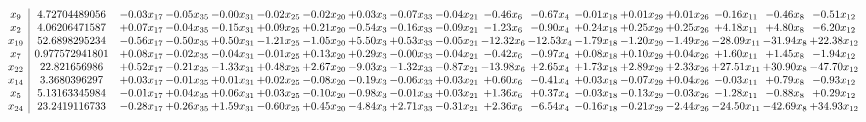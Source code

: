\documentclass[9pt]{article}
\begin{document}
 \[\begin{array}{c| c c@{\hskip 2pt} c@{\hskip 2pt} c@{\hskip 2pt} c@{\hskip 2pt} c@{\hskip 2pt} c@{\hskip 2pt} c@{\hskip 2pt} c@{\hskip 2pt} c@{\hskip 2pt} c@{\hskip 2pt} c@{\hskip 2pt} c@{\hskip 2pt} c@{\hskip 2pt} c@{\hskip 2pt} c@{\hskip 2pt} c@{\hskip 2pt} }
 x_{9}   &  4.72704489056 & -0.03 x_{17} & -0.05 x_{35} & -0.00 x_{31} & -0.02 x_{25} & -0.02 x_{20} & +  0.03 x_{3} & -0.07 x_{33} & -0.04 x_{21} & -0.46 x_{6} & -0.67 x_{4} & -0.01 x_{18} & +  0.01 x_{29} & +  0.01 x_{26} & -0.16 x_{11} & -0.46 x_{8} & -0.51 x_{12}\\
 x_{2}   &  4.06206471587 & +  0.07 x_{17} & -0.04 x_{35} & -0.15 x_{31} & +  0.09 x_{25} & +  0.21 x_{20} & -0.54 x_{3} & -0.16 x_{33} & -0.09 x_{21} & -1.23 x_{6} & -0.90 x_{4} & +  0.24 x_{18} & +  0.25 x_{29} & +  0.25 x_{26} & +  4.18 x_{11} & +  4.80 x_{8} & -6.20 x_{12}\\
 x_{19}   &  52.6898295234 & -0.56 x_{17} & -0.50 x_{35} & +  0.50 x_{31} & -1.21 x_{25} & -1.05 x_{20} & +  5.50 x_{3} & +  0.53 x_{33} & -0.05 x_{21} & -12.32 x_{6} & -12.53 x_{4} & -1.79 x_{18} & -1.20 x_{29} & -1.49 x_{26} & -28.09 x_{11} & -31.94 x_{8} & + 22.38 x_{12}\\
 x_{7}   &  0.977572941801 & +  0.08 x_{17} & -0.02 x_{35} & -0.04 x_{31} & -0.01 x_{25} & +  0.13 x_{20} & +  0.29 x_{3} & -0.00 x_{33} & -0.04 x_{21} & -0.42 x_{6} & -0.97 x_{4} & +  0.08 x_{18} & +  0.10 x_{29} & +  0.04 x_{26} & +  1.60 x_{11} & +  1.45 x_{8} & -1.94 x_{12}\\
 x_{22}   &  22.821656986 & +  0.52 x_{17} & -0.21 x_{35} & -1.33 x_{31} & +  0.48 x_{25} & +  2.67 x_{20} & -9.03 x_{3} & -1.32 x_{33} & -0.87 x_{21} & -13.98 x_{6} & +  2.65 x_{4} & +  1.73 x_{18} & +  2.89 x_{29} & +  2.33 x_{26} & + 27.51 x_{11} & + 30.90 x_{8} & -47.70 x_{12}\\
 x_{14}   &  3.3680396297 & +  0.03 x_{17} & -0.01 x_{35} & +  0.01 x_{31} & +  0.02 x_{25} & -0.08 x_{20} & -0.19 x_{3} & -0.06 x_{33} & +  0.03 x_{21} & +  0.60 x_{6} & -0.41 x_{4} & +  0.03 x_{18} & -0.07 x_{29} & +  0.04 x_{26} & -0.03 x_{11} & +  0.79 x_{8} & -0.93 x_{12}\\
 x_{5}   &  5.13163345984 & -0.01 x_{17} & +  0.04 x_{35} & +  0.06 x_{31} & +  0.03 x_{25} & -0.10 x_{20} & -0.98 x_{3} & -0.01 x_{33} & +  0.03 x_{21} & +  1.36 x_{6} & +  0.37 x_{4} & -0.03 x_{18} & -0.13 x_{29} & -0.03 x_{26} & -1.28 x_{11} & -0.88 x_{8} & +  0.29 x_{12}\\
 x_{24}   &  23.2419116733 & -0.28 x_{17} & +  0.26 x_{35} & +  1.59 x_{31} & -0.60 x_{25} & +  0.45 x_{20} & -4.84 x_{3} & +  2.71 x_{33} & -0.31 x_{21} & +  2.36 x_{6} & -6.54 x_{4} & -0.16 x_{18} & -0.21 x_{29} & -2.44 x_{26} & -24.50 x_{11} & -42.69 x_{8} & + 34.93 x_{12}\\

\end{array}\]
\end{document}

